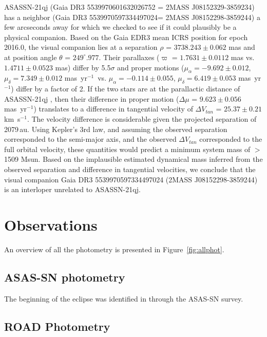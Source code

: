 \documentclass{aa}
\newcommand{\kms}{km~s$^{-1}$\xspace}
\newcommand{\masyr}{mas~yr$^{-1}$}
\begin{document}
ASASSN-21qj (Gaia DR3 5539970601632026752 = 2MASS J08152329-3859234) has a neighbor (Gaia DR3 5539970597334497024= 2MASS J08152298-3859244) a few arcseconds away for which we checked to see if it could plausibly be a physical companion.
%
Based on the Gaia EDR3 mean ICRS position for epoch 2016.0, the visual companion lies at a separation $\rho$ = $3738.243\pm0.062$ mas and at position angle $\theta$ = $249^{\circ}.977$.
%
Their parallaxes ($\varpi$ = $1.7631\pm0.0112$ mas vs. $1.4711\pm0.0523$ mas) differ by 5.5$\sigma$ and proper motions ($\mu_{\alpha} = -9.692\pm0.012$, $\mu_{\delta} = 7.349\pm0.012$ \masyr\, vs. $\mu_{\alpha} = -0.114\pm0.055$, $\mu_{\delta} = 6.419\pm0.053$ \masyr) differ by a factor of 2.
%
If the two stars are at the parallactic distance of ASASSN-21qj
\citep[$d$ = 552.4 pc;][]{BailerJones21}, then their difference in proper motion ($\Delta\mu$ = $9.623\pm0.056$ \masyr) translates to a difference in tangential velocity of $\Delta V_{tan}$ = $25.37\pm0.21$ \kms.
%
The velocity difference is considerable given the projected separation of 2079\,au.
%
Using Kepler's 3rd law, and assuming the observed separation corresponded
to the semi-major axis, and the observed $\Delta V_{tan}$ corresponded to the full orbital velocity, these quantities would predict a minimum system mass of $>$1509 Msun.
%
Based on the implausible estimated dynamical mass inferred from the observed separation and difference in tangential velocities, we conclude that the visual companion Gaia DR3 5539970597334497024 (2MASS J08152298-3859244) is an interloper
unrelated to ASASSN-21qj.

\section{Observations}\label{sec:obs}
An overview of all the photometry is presented in Figure~\ref{fig:allphot}.




\subsection{ASAS-SN photometry}

The beginning of the eclipse was identified in \citet{RizzoSmith21} through the ASAS-SN survey.
%

\subsection{ROAD Photometry}
\end{document}
